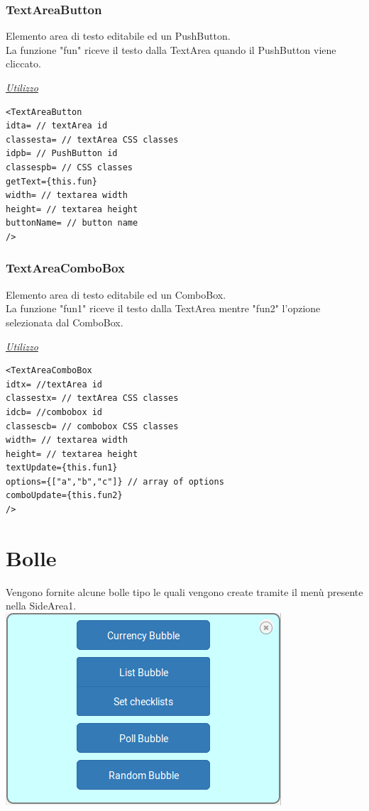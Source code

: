 \subsubsection{TextAreaButton}
Elemento area di testo editabile ed un PushButton.\\
La funzione "fun" riceve il testo dalla TextArea quando il PushButton viene cliccato.
\begin{center}
\underline{\textit{Utilizzo}}
\begin{lstlisting}
<TextAreaButton
idta= // textArea id
classesta= // textArea CSS classes
idpb= // PushButton id
classespb= // CSS classes
getText={this.fun}
width= // textarea width
height= // textarea height
buttonName= // button name
/>
\end{lstlisting}
\end{center}
\newpage
\subsubsection{TextAreaComboBox}
Elemento area di testo editabile ed un ComboBox.\\
La funzione "fun1" riceve il testo dalla TextArea mentre "fun2" l'opzione selezionata dal ComboBox.
\begin{center}
\underline{\textit{Utilizzo}}
\begin{lstlisting}
<TextAreaComboBox
idtx= //textArea id
classestx= // textArea CSS classes
idcb= //combobox id
classescb= // combobox CSS classes
width= // textarea width
height= // textarea height
textUpdate={this.fun1}
options={["a","b","c"]} // array of options
comboUpdate={this.fun2}
/>
\end{lstlisting}
\end{center}

\section{Bolle}
Vengono fornite alcune bolle tipo le quali vengono create tramite il menù presente nella SideArea1.\\

\includegraphics[scale=0.75]{img/menu.png}
\newpage
